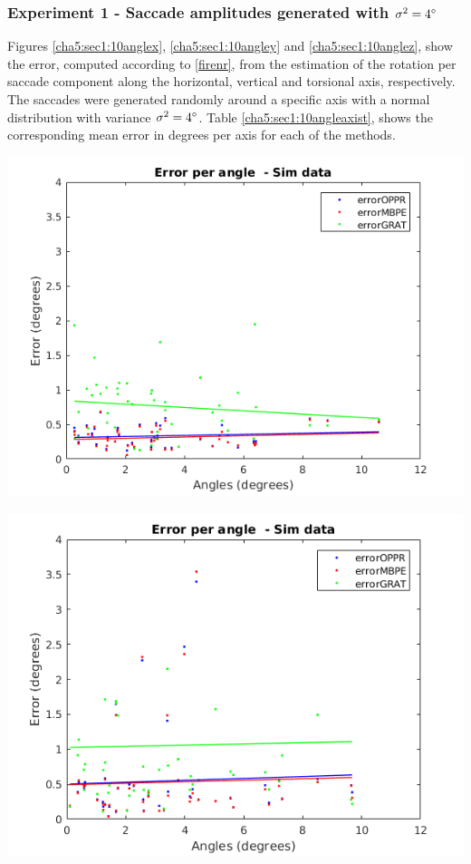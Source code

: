 \subsubsection{Experiment 1 - Saccade amplitudes generated with $\sigma^2 = 4 \degree $}
Figures \ref{cha5:sec1:10anglex}, \ref{cha5:sec1:10angley} and \ref{cha5:sec1:10anglez}, show the error, computed according to \ref{firenr}, from the estimation of the rotation per saccade component along the horizontal, vertical and torsional axis, respectively. The saccades were generated randomly around a specific axis with a normal distribution with variance $\sigma^2 = 4 \degree$. Table \ref{cha5:sec1:10angleaxist}, shows the corresponding mean error in degrees per axis for each of the methods.\\

\begin{minipage}{0.5\textwidth}
	\centering
	\includegraphics[width=\textwidth]{images/sim/10anglex.png}
	\label{cha5:sec1:10anglex}
\end{minipage}
\begin{minipage}{0.5\textwidth}
	\centering
	\includegraphics[width=\textwidth]{images/sim/10angley.png}
	\label{cha5:sec1:10angley}
\end{minipage}
